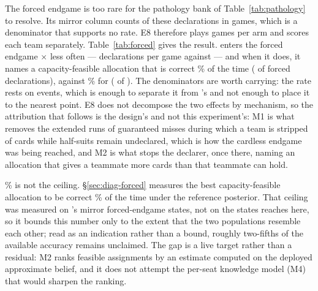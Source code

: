 The forced endgame is too rare for the pathology bank of
Table~\ref{tab:pathology} to resolve. Its \vfive{} mirror column counts
\numFiveForced{} of these declarations in \numFiveGames{} games, which is a
denominator that supports no rate. E8 therefore plays
\numForcedEightGames{} games per arm and scores each team separately.
Table~\ref{tab:forced} gives the result. \vfive{} enters the forced endgame
\numForcedRateRatio$\times$ less often --- \numVfiveForcedRate{} declarations per
game against \numVfourForcedRate{} --- and when it does, it names a
capacity-feasible allocation that is correct \numVfiveForcedAcc\% of the time
(\numVfiveForcedRightN{} of \numVfiveForcedN{} forced declarations), against
\numVfourForcedAcc\% for \vfour{} (\numVfourForcedRightN{} of
\numVfourForcedN{}). The denominators are worth carrying: the \vfive{} rate rests
on \numVfiveForcedN{} events, which is enough to separate it from \vfour{}'s and
not enough to place it to the nearest point. E8 does not decompose the two
effects by mechanism, so the attribution that follows is the design's and not
this experiment's: M1 is what removes the extended runs of guaranteed misses
during which a team is stripped of cards while half-suits remain undeclared,
which is how the cardless endgame was being reached, and M2 is what stops the
declarer, once there, naming an allocation that gives a teammate more cards than
that teammate can hold.

\numVfiveForcedAcc\% is not the ceiling. \S\ref{sec:diag-forced} measures the best
capacity-feasible allocation to be correct \numFeasibleRight\% of the time under
the reference posterior. That ceiling was measured on \vfour{}'s mirror
forced-endgame states, not on the states \vfive{} reaches here, so it bounds this
number only to the extent that the two populations resemble each other; read as
an indication rather than a bound, roughly two-fifths of the available accuracy
remains unclaimed. The gap is a live target rather than a residual: M2 ranks
feasible assignments by an estimate computed on the deployed approximate belief,
and it does not attempt the per-seat knowledge model (M4) that would sharpen the
ranking.

